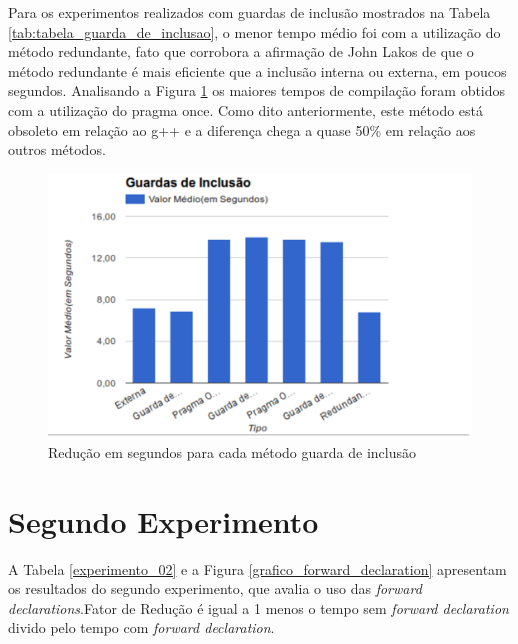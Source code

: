 Para os experimentos realizados com guardas de inclusão mostrados na 
Tabela \ref{tab:tabela_guarda_de_inclusao}, o menor tempo médio foi
 com a utilização do método redundante, fato  que corrobora a afirmação
 de John Lakos de que o método redundante é mais eficiente que a inclusão
 interna ou externa, em poucos segundos. Analisando a Figura 
\ref{grafico_guardas_de_inclusao} os maiores tempos de compilação foram 
 obtidos com a utilização do pragma once. Como dito anteriormente, este 
método está obsoleto em relação ao g++ e a diferença chega a quase 50\%
 em relação aos outros métodos.

\begin{figure}[h]
    \centering
        \includegraphics[keepaspectratio=true,scale=1]{figuras/guardas_de_inclusao.eps}
    \caption{Redução em segundos para cada método guarda de inclusão}
    \label{grafico_guardas_de_inclusao}
\end{figure}


\section{Segundo Experimento}


A Tabela \ref{experimento_02} e a Figura \ref{grafico_forward_declaration} apresentam os resultados do
 segundo experimento, que avalia o uso das \textit{forward declarations}.Fator de
 Redução é igual a 1 menos o tempo sem \textit{forward declaration} divido pelo
 tempo com \textit{forward declaration}.



